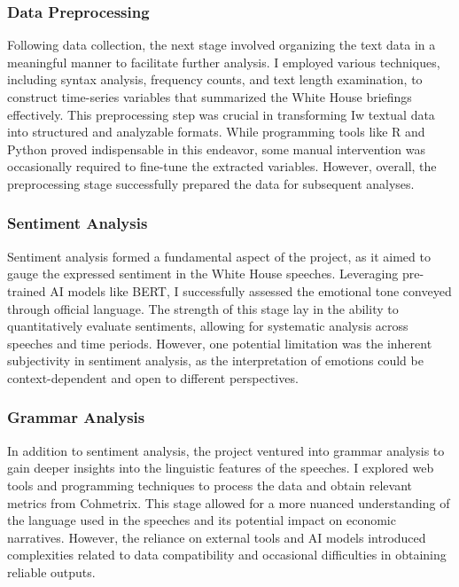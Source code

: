 \documentclass{article}
\begin{document}
\subsubsection{Data Preprocessing}
Following data collection, the next stage involved organizing the text data in a meaningful manner to facilitate further analysis. I employed various techniques, including syntax analysis, frequency counts, and text length examination, to construct time-series variables that summarized the White House briefings effectively. This preprocessing step was crucial in transforming Iw textual data into structured and analyzable formats. While programming tools like R and Python proved indispensable in this endeavor, some manual intervention was occasionally required to fine-tune the extracted variables. However, overall, the preprocessing stage successfully prepared the data for subsequent analyses.

\subsubsection{Sentiment Analysis}
Sentiment analysis formed a fundamental aspect of the project, as it aimed to gauge the expressed sentiment in the White House speeches. Leveraging pre-trained AI models like BERT, I successfully assessed the emotional tone conveyed through official language. The strength of this stage lay in the ability to quantitatively evaluate sentiments, allowing for systematic analysis across speeches and time periods. However, one potential limitation was the inherent subjectivity in sentiment analysis, as the interpretation of emotions could be context-dependent and open to different perspectives.

\subsubsection{Grammar Analysis}
In addition to sentiment analysis, the project ventured into grammar analysis to gain deeper insights into the linguistic features of the speeches. I explored web tools and programming techniques to process the data and obtain relevant metrics from Cohmetrix. This stage allowed for a more nuanced understanding of the language used in the speeches and its potential impact on economic narratives. However, the reliance on external tools and AI models introduced complexities related to data compatibility and occasional difficulties in obtaining reliable outputs.
\end{document}

